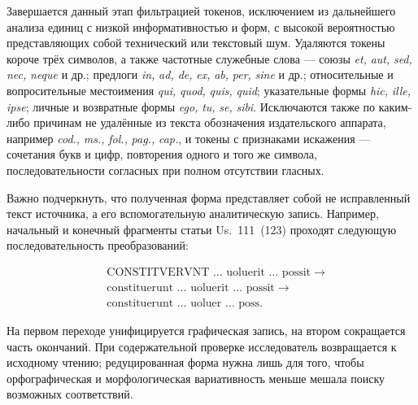 Завершается данный этап фильтрацией токенов, исключением из дальнейшего анализа единиц с низкой информативностью и форм, с высокой вероятностью представляющих собой технический или текстовый шум. Удаляются токены короче трёх символов, а также частотные служебные слова --- союзы \emph{et}\emph{, }\emph{aut}\emph{, }\emph{sed}\emph{, }\emph{nec}\emph{, }\emph{neque}\emph{ }и др.; предлоги \emph{in, }\emph{ad}\emph{, de, }\emph{ex}\emph{, }\emph{ab}\emph{, }\emph{per}\emph{, }\emph{sine}\emph{ }и др.; относительные и вопросительные местоимения \emph{qui}\emph{, }\emph{quod}\emph{, }\emph{quis}\emph{, }\emph{quid}; указательные формы \emph{hic}\emph{, }\emph{ille}\emph{, }\emph{ipse}; личные и возвратные формы \emph{ego}\emph{, }\emph{tu}\emph{, }\emph{se}\emph{, }\emph{sibi}. Исключаются также по каким-либо причинам не удалённые из текста обозначения издательского аппарата, например \emph{cod}\emph{., }\emph{ms}\emph{., }\emph{fol}\emph{., }\emph{pag}\emph{., }\emph{cap}\emph{.}, и токены с признаками искажения --- сочетания букв и цифр, повторения одного и того же символа, последовательности согласных при полном отсутствии гласных.

Важно подчеркнуть, что полученная форма представляет собой не исправленный текст источника, а его вспомогательную аналитическую запись. Например, начальный и конечный фрагменты статьи Us.~111~(123) проходят следующую последовательность преобразований:

\begin{equation*}
\begin{aligned}
&\text{CONSTITVERVNT \ldots{} uoluerit \ldots{} possit}\;\longrightarrow\\
&\text{constituerunt \ldots{} uoluerit \ldots{} possit}\;\longrightarrow\\
&\text{constituerunt \ldots{} uoluer \ldots{} poss}.
\end{aligned}
\end{equation*}

На первом переходе унифицируется графическая запись, на втором сокращается часть окончаний. При содержательной проверке исследователь возвращается к исходному чтению; редуцированная форма нужна лишь для того, чтобы орфографическая и морфологическая вариативность меньше мешала поиску возможных соответствий.

